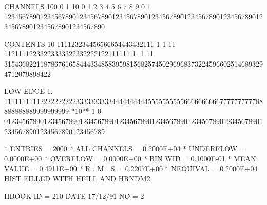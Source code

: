 \begin{Listing}
 CHANNELS 100   0                                                                                                  1   
           10   0        1         2         3         4         5         6         7         8         9         0   
            1   1234567890123456789012345678901234567890123456789012345678901234567890123456789012345678901234567890   
 
 CONTENTS  10                   111123234456566654443432111 1  1   11 11211112233223333322332222122111111           
            1.        1  11 3154368221187867616584443348583959815682574502969683732245966025146893294712079898422   
 
 LOW-EDGE   1.            111111111122222222223333333333444444444455555555556666666666777777777788888888889999999999
 *10**  1   0   0123456789012345678901234567890123456789012345678901234567890123456789012345678901234567890123456789
 
 * ENTRIES =       2000      * ALL CHANNELS = 0.2000E+04      * UNDERFLOW = 0.0000E+00      * OVERFLOW = 0.0000E+00
 * BIN WID = 0.1000E-01      * MEAN VALUE   = 0.4911E+00      * R . M . S = 0.2207E+00      * NEQUIVAL = 0.2000E+04
\newpage
 HIST FILLED WITH HFILL AND HRNDM2                                               
 
 HBOOK     ID =       210                                        DATE  17/12/91              NO =   2
 

\end{Listing}
